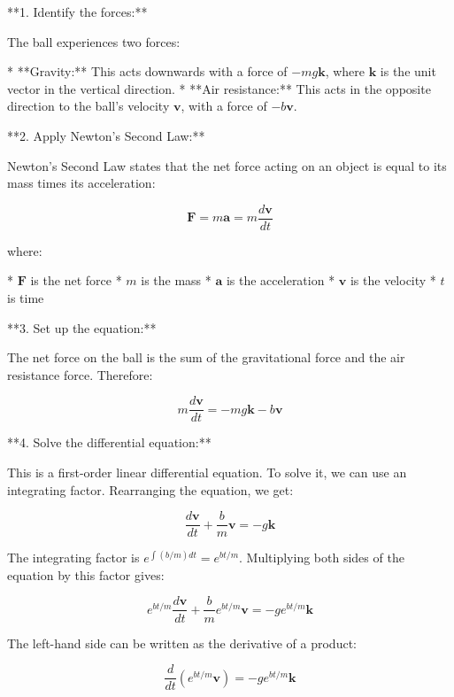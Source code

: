 \documentclass{article}
\begin{document}
**1. Identify the forces:**

The ball experiences two forces:

* **Gravity:**  This acts downwards with a force of $-mg\mathbf{k}$, where $\mathbf{k}$ is the unit vector in the vertical direction.
* **Air resistance:** This acts in the opposite direction to the ball's velocity $\mathbf{v}$, with a force of $-b\mathbf{v}$.

**2. Apply Newton's Second Law:**

Newton's Second Law states that the net force acting on an object is equal to its mass times its acceleration:

\begin{equation*}
\mathbf{F} = m\mathbf{a} = m\frac{d\mathbf{v}}{dt}
\end{equation*}

where:

* $\mathbf{F}$ is the net force
* $m$ is the mass
* $\mathbf{a}$ is the acceleration
* $\mathbf{v}$ is the velocity
* $t$ is time

**3. Set up the equation:**

The net force on the ball is the sum of the gravitational force and the air resistance force.  Therefore:

\begin{equation*}
m\frac{d\mathbf{v}}{dt} = -mg\mathbf{k} - b\mathbf{v}
\end{equation*}

**4. Solve the differential equation:**

This is a first-order linear differential equation. To solve it, we can use an integrating factor.  Rearranging the equation, we get:

\begin{equation*}
\frac{d\mathbf{v}}{dt} + \frac{b}{m}\mathbf{v} = -g\mathbf{k}
\end{equation*}

The integrating factor is $e^{\int (b/m) dt} = e^{bt/m}$. Multiplying both sides of the equation by this factor gives:

\begin{equation*}
e^{bt/m}\frac{d\mathbf{v}}{dt} + \frac{b}{m}e^{bt/m}\mathbf{v} = -ge^{bt/m}\mathbf{k}
\end{equation*}

The left-hand side can be written as the derivative of a product:

\begin{equation*}
\frac{d}{dt}\left(e^{bt/m}\mathbf{v}\right) = -ge^{bt/m}\mathbf{k}
\end{equation*}
\end{document}
